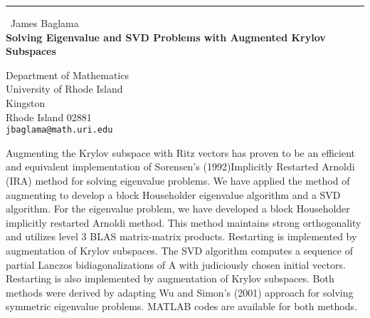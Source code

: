 \documentclass{report}
\begin{document}
\begin{center}
\rule{6in}{1pt} \
{\large James Baglama \\
{\bf Solving Eigenvalue and SVD Problems with Augmented Krylov Subspaces}}

Department of Mathematics  \\ University of Rhode Island \\ Kingston \\ Rhode Island 02881
\\
{\tt jbaglama@math.uri.edu}\end{center}

Augmenting the Krylov subspace with Ritz vectors has proven
to be an efficient and equivalent implementation of Sorensen's
(1992)Implicitly Restarted Arnoldi (IRA) method for solving
eigenvalue problems. We have applied the method of augmenting
to develop a block Householder eigenvalue algorithm and a SVD
algorithm. For the eigenvalue problem, we have developed a
block Householder implicitly restarted Arnoldi method. This method
maintains strong orthogonality and utilizes level 3 BLAS
matrix-matrix products. Restarting is implemented by augmentation of
Krylov subspaces. The SVD algorithm computes a sequence of partial
Lanczos bidiagonalizations of A with judiciously chosen initial vectors.
Restarting is also implemented by augmentation of Krylov subspaces. Both
methods were derived by adapting Wu and Simon's (2001) approach for
solving symmetric eigenvalue problems. MATLAB codes are available for
both methods.
\end{document}
